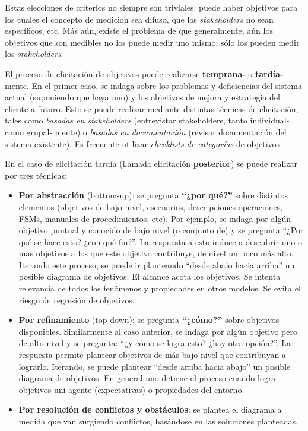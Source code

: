 \documentclass[]{article}
\begin{document}
Estas elecciones de criterios no siempre son triviales: puede haber objetivos para los cuales el concepto de medición sea difuso, que los \textit{stakeholders} no sean específicos, etc. Más aún, existe el problema de que generalmente, aún los objetivos que son medibles no los puede medir uno mismo; sólo los pueden medir los \textit{stakeholders}.

El proceso de elicitación de objetivos puede realizarse \textbf{temprana-} o \textbf{tardía-} mente. En el primer caso, se indaga sobre los problemas y deficiencias del sistema actual (suponiendo que haya uno) y los objetivos de mejora y estrategia del cliente a futuro. Esto se puede realizar mediante distintas técnicas de elicitación, tales como \textit{basadas en stakeholders} (entrevistar stakeholders, tanto individual- como grupal- mente) o \textit{basadas en documentación} (revisar documentación del sistema existente). Es frecuente utilizar \textit{checklists de categorías} de objetivos.

En el caso de elicitación tardía (llamada elicitación \textbf{posterior}) se puede realizar por tres técnicas:
\begin{itemize}
	\item \textbf{Por abstracción} (bottom-up): se pregunta \textbf{``¿por qué?''} sobre distintos elementos (objetivos de bajo nivel, escenarios, descripciones operaciones, FSMs, manuales de procedimientos, etc). Por ejemplo, se indaga por algún objetivo puntual y conocido de bajo nivel (o conjunto de) y se pregunta ``¿Por qué se hace esto? ¿con qué fin?''. La respuesta a esto induce a descubrir uno o más objetivos a los que este objetivo contribuye, de nivel un poco más alto. Iterando este proceso, se puede ir planteando ``desde abajo hacia arriba'' un posible diagrama de objetivos. El alcance acota los objetivos. Se intenta relevancia de todos los fenómenos y propiedades en otros modelos. Se evita el riesgo de regresión de objetivos.
	\item \textbf{Por refinamiento} (top-down): se pregunta \textbf{``¿cómo?''} sobre objetivos disponibles. Similarmente al caso anterior, se indaga por algún objetivo pero de alto nivel y se pregunta: ``¿y cómo se logra esto? ¿hay otra opción?''. La respuesta permite plantear objetivos de más bajo nivel que contribuyan a lograrlo. Iterando, se puede plantear ``desde arriba hacia abajo'' un posible diagrama de objetivos. En general uno detiene el proceso cuando logra objetivos uni-agente (expectativas) o propiedades del entorno.
	\item \textbf{Por resolución de conflictos y obstáculos}: se plantea el diagrama a medida que van surgiendo conflictos, basándose en las soluciones planteadas.
\end{itemize}
\end{document}
